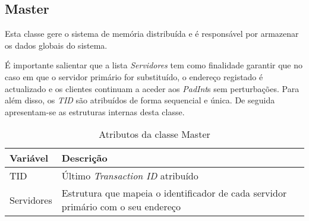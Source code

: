 \subsection{Master}

Esta classe gere o sistema de memória distribuída e é responsável por armazenar os dados globais do sistema.

É importante salientar que a lista \textit{Servidores} tem como finalidade garantir que no caso em que o servidor primário for substituído, o endereço registado é actualizado e os clientes continuam a aceder aos \textit{PadInt}s sem perturbações. Para além disso, os \textit{TID} são atribuídos de forma sequencial e única. De seguida apresentam-se as estruturas internas desta classe.
\begin{table}[H]
\centering
\begin{tabular}{| p{2cm} | p{5cm} |}
\hline
\textbf{Variável} & \textbf{Descrição} \\
\hline
TID & Último \textit{Transaction ID} atribuído \\
\hline
Servidores & Estrutura que mapeia o identificador de cada servidor primário com o seu endereço \\
\hline
\end{tabular}
\caption{Atributos da classe Master}
\end{table}
